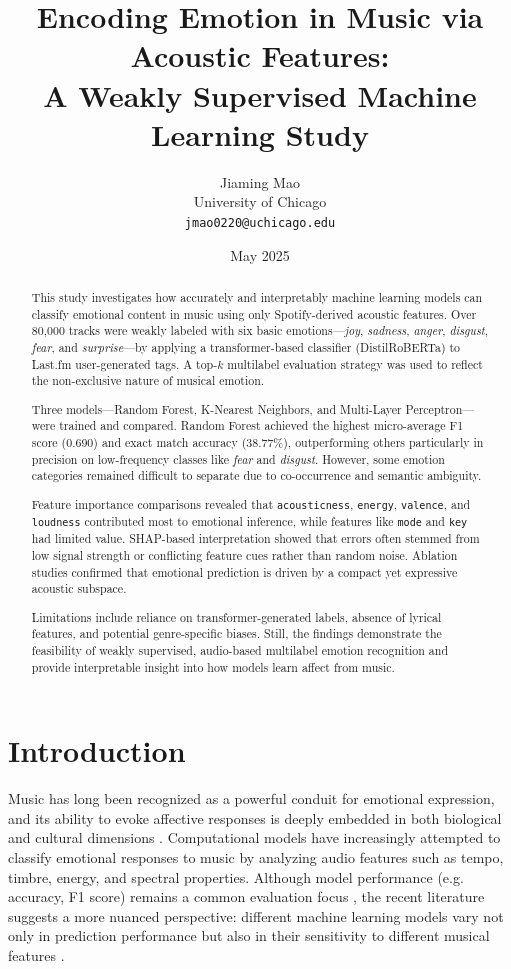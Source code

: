 \documentclass{article}
\title{Encoding Emotion in Music via Acoustic Features:\\
A Weakly Supervised Machine Learning Study}
\author{Jiaming Mao \\ University of Chicago \\ 
\texttt{jmao0220@uchicago.edu}}
\date{May 2025}
\begin{document}
\maketitle

\begin{abstract}
This study investigates how accurately and interpretably machine learning models can classify emotional content in music using only Spotify-derived acoustic features. Over 80,000 tracks were weakly labeled with six basic emotions—\textit{joy}, \textit{sadness}, \textit{anger}, \textit{disgust}, \textit{fear}, and \textit{surprise}—by applying a transformer-based classifier (DistilRoBERTa) to Last.fm user-generated tags. A top-$k$ multilabel evaluation strategy was used to reflect the non-exclusive nature of musical emotion.

Three models—Random Forest, K-Nearest Neighbors, and Multi-Layer Perceptron—were trained and compared. Random Forest achieved the highest micro-average F1 score (0.690) and exact match accuracy (38.77\%), outperforming others particularly in precision on low-frequency classes like \textit{fear} and \textit{disgust}. However, some emotion categories remained difficult to separate due to co-occurrence and semantic ambiguity.

Feature importance comparisons revealed that \texttt{acousticness}, \texttt{energy}, \texttt{valence}, and \texttt{loudness} contributed most to emotional inference, while features like \texttt{mode} and \texttt{key} had limited value. SHAP-based interpretation showed that errors often stemmed from low signal strength or conflicting feature cues rather than random noise. Ablation studies confirmed that emotional prediction is driven by a compact yet expressive acoustic subspace.

Limitations include reliance on transformer-generated labels, absence of lyrical features, and potential genre-specific biases. Still, the findings demonstrate the feasibility of weakly supervised, audio-based multilabel emotion recognition and provide interpretable insight into how models learn affect from music.
\end{abstract}


\section{Introduction}
    
Music has long been recognized as a powerful conduit for emotional expression, and its ability to evoke affective responses is deeply embedded in both biological and cultural dimensions \parencite{Huron2015, Perlovsky2010}. Computational models have increasingly attempted to classify emotional responses to music by analyzing audio features such as tempo, timbre, energy, and spectral properties. Although model performance (e.g. accuracy, F1 score) remains a common evaluation focus \parencite{Yang2024, Yoo2024}, the recent literature suggests a more nuanced perspective: different machine learning models vary not only in prediction performance but also in their sensitivity to different musical features \parencite{Xia2022, Xu2011}.
\end{document}
